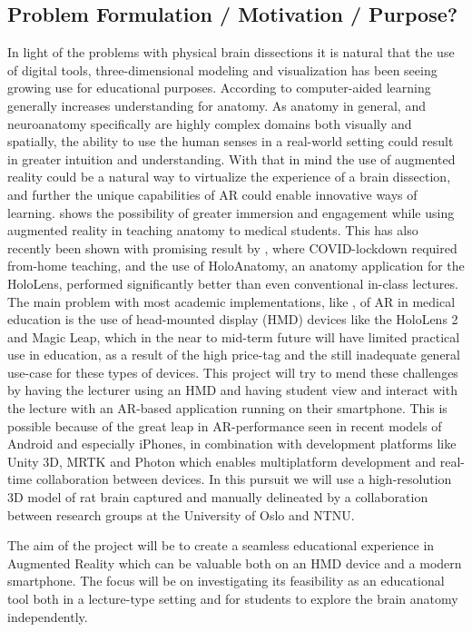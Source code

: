 \subsection*{Problem Formulation / Motivation / Purpose?}

In light of the problems with physical brain dissections it is natural that the use of digital tools, three-dimensional modeling and visualization has been seeing growing use for educational purposes. 
According to \citep{Dalgarno2010} computer-aided learning generally increases understanding for anatomy. As anatomy in general, and neuroanatomy specifically are highly complex domains both visually and spatially, the ability to use the human senses in a real-world setting could result in greater intuition and understanding. With that in mind the use of augmented reality could be a natural way to virtualize the experience of a brain dissection, and further the unique capabilities of AR could enable innovative ways of learning. \citep{Moro2017} shows the possibility of greater immersion and engagement while using augmented reality in teaching anatomy to medical students. This has also recently been shown with promising result by  \citep{Wish2020}, where COVID-lockdown required from-home teaching, and the use of HoloAnatomy, an anatomy application for the HoloLens, performed significantly better than even conventional in-class lectures.
The main problem with most academic implementations, like \citep{Wish2020}, of AR in medical education is the use of head-mounted display (HMD) devices like the HoloLens 2 and Magic Leap, which in the near to mid-term future will have limited practical use in education, as a result of the high price-tag and the still inadequate general use-case for these types of devices.
This project will try to mend these challenges by having the lecturer using an HMD and having student view and interact with the lecture with an AR-based application running on their smartphone. This is possible because of the great leap in AR-performance seen in recent models of Android and especially iPhones, in combination with development platforms like Unity 3D, MRTK and Photon which enables multiplatform development and real-time collaboration between devices. In this pursuit we will use a high-resolution 3D model of rat brain captured and manually delineated by a collaboration between research groups at the University of Oslo and NTNU. 

The aim of the project will be to create a seamless educational experience in Augmented Reality which can be valuable both on an HMD device and a modern smartphone. The focus will be on investigating its feasibility as an educational tool both in a lecture-type setting and for students to explore the brain anatomy independently. 


